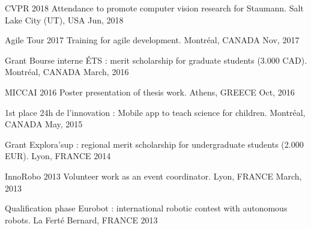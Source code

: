 


\begin{cvhonors}

\cvhonor
{CVPR 2018} %
{Attendance to promote computer vision research for Staumann.} %
{Salt Lake City (UT), USA} %
{Jun, 2018} %

\cvhonor
{Agile Tour 2017} %
{Training for agile development.} %
{Montréal, CANADA} %
{Nov, 2017} %

\cvhonor
{Grant} %
{Bourse interne ÉTS : merit scholarship for graduate students (3.000 CAD).} %
{Montréal, CANADA} %
{March, 2016} %

\cvhonor
{MICCAI 2016} %
{Poster presentation of thesis work.} %
{Athens, GREECE} %
{Oct, 2016} %

\cvhonor
{1st place} %
{24h de l'innovation : Mobile app to teach science for children.} %
{Montréal, CANADA} %
{May, 2015} %


\cvhonor
{Grant} %
{Explora'sup : regional merit scholarship for undergraduate students (2.000 EUR).} %
{Lyon, FRANCE} %
{2014} %

\cvhonor
{InnoRobo 2013} %
{Volunteer work as an event coordinator.} %
{Lyon, FRANCE} %
{March, 2013} %

\cvhonor
{Qualification phase} %
{Eurobot : international robotic contest with autonomous robots.} %
{La Ferté Bernard, FRANCE} %
{2013} %

\end{cvhonors}
